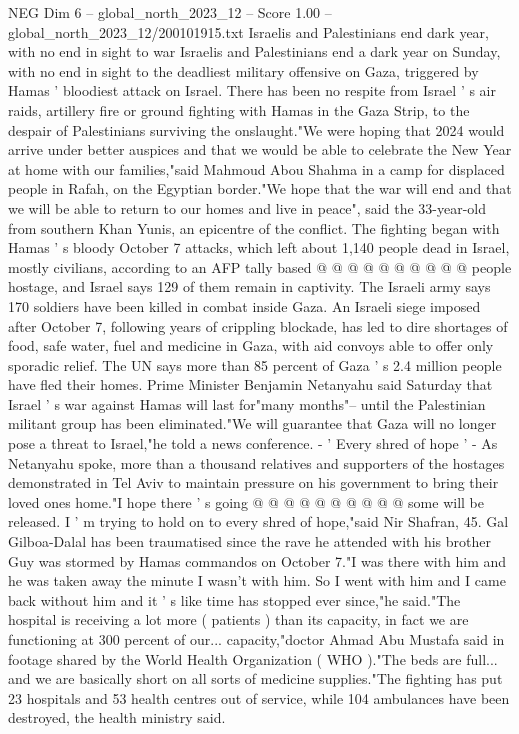 \begin{textsample}{NEG Dim 6 – global\_north\_2023\_12 – Score 1.00 – global\_north\_2023\_12/200101915.txt}  \label{ex:f6_neg_324}
Israelis and Palestinians end dark year, with no end in sight to war Israelis and Palestinians end a dark year on Sunday, with no end in sight to the deadliest military offensive on Gaza, triggered by Hamas ' bloodiest attack on Israel.
There has been no respite from Israel ' s air raids, artillery fire or ground fighting with Hamas in the Gaza Strip, to the despair of Palestinians surviving the onslaught."We were hoping that 2024 would arrive under better auspices and that we would be able to celebrate the New Year at home with our families,"said Mahmoud Abou Shahma in a camp for displaced people in Rafah, on the Egyptian border."We hope that the war will end and that we will be able to return to our homes and live in peace", said the 33-year-old from southern Khan Yunis, an epicentre of the conflict.
The fighting began with Hamas ' s bloody October 7 attacks, which left about 1,140 people dead in Israel, mostly civilians, according to an AFP tally based @ @ @ @ @ @ @ @ @ @ people hostage, and Israel says 129 of them remain in captivity.
The Israeli army says 170 soldiers have been killed in combat inside Gaza.
An Israeli siege imposed after October 7, following years of crippling blockade, has led to dire shortages of food, safe water, fuel and medicine in Gaza, with aid convoys able to offer only sporadic relief.
The UN says more than 85 percent of Gaza ' s 2.4 million people have fled their homes.
Prime Minister Benjamin Netanyahu said Saturday that Israel ' s war against Hamas will last for"many months"-- until the Palestinian militant group has been eliminated."We will guarantee that Gaza will no longer pose a threat to Israel,"he told a news conference. - ' Every shred of hope ' - As Netanyahu spoke, more than a thousand relatives and supporters of the hostages demonstrated in Tel Aviv to maintain pressure on his government to bring their loved ones home."I hope there ' s going @ @ @ @ @ @ @ @ @ @ some will be released.
I ' m trying to hold on to every shred of hope,"said Nir Shafran, 45.
Gal Gilboa-Dalal has been traumatised since the rave he attended with his brother Guy was stormed by Hamas commandos on October 7."I was there with him and he was taken away the minute I wasn't with him.
So I went with him and I came back without him and it ' s like time has stopped ever since,"he said."The hospital is receiving a lot more ( patients ) than its capacity, in fact we are functioning at 300 percent of our... capacity,"doctor Ahmad Abu Mustafa said in footage shared by the World Health Organization ( WHO )."The beds are full... and we are basically short on all sorts of medicine supplies."The fighting has put 23 hospitals and 53 health centres out of service, while 104 ambulances have been destroyed, the health ministry said.

\end{textsample}
